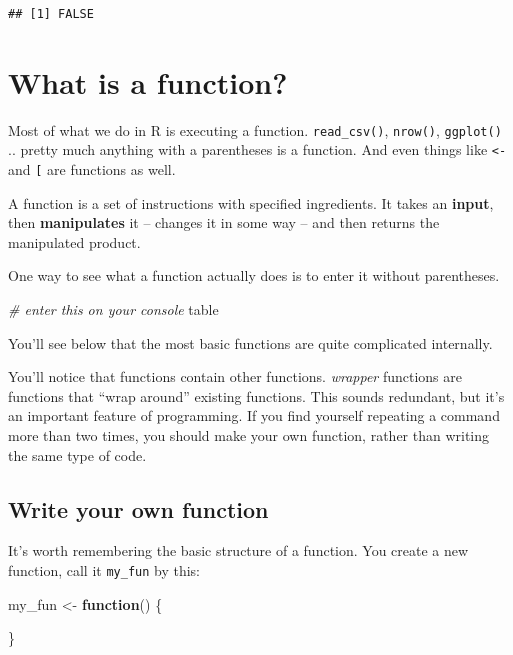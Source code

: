 \documentclass[]{book}
\newenvironment{Shaded}{\begin{snugshade}}{\end{snugshade}}
\newcommand{\StringTok}[1]{\textcolor[rgb]{0.31,0.60,0.02}{#1}}
\newcommand{\CommentTok}[1]{\textcolor[rgb]{0.56,0.35,0.01}{\textit{#1}}}
\newcommand{\ControlFlowTok}[1]{\textcolor[rgb]{0.13,0.29,0.53}{\textbf{#1}}}
\newcommand{\NormalTok}[1]{#1}
\theoremstyle{definition}
\theoremstyle{definition}
\theoremstyle{definition}
\theoremstyle{remark}
\begin{document}
\begin{verbatim}
## [1] FALSE
\end{verbatim}

\section{What is a function?}\label{what-is-a-function}

Most of what we do in R is executing a function. \texttt{read\_csv()},
\texttt{nrow()}, \texttt{ggplot()} .. pretty much anything with a
parentheses is a function. And even things like \texttt{\textless{}-}
and \texttt{{[}} are functions as well.

A function is a set of instructions with specified ingredients. It takes
an \textbf{input}, then \textbf{manipulates} it -- changes it in some
way -- and then returns the manipulated product.

One way to see what a function actually does is to enter it without
parentheses.

\begin{Shaded}
\begin{Highlighting}[]
\CommentTok{# enter this on your console}
\NormalTok{table}
\end{Highlighting}
\end{Shaded}

You'll see below that the most basic functions are quite complicated
internally.

You'll notice that functions contain other functions. \emph{wrapper}
functions are functions that ``wrap around'' existing functions. This
sounds redundant, but it's an important feature of programming. If you
find yourself repeating a command more than two times, you should make
your own function, rather than writing the same type of code.

\subsection{Write your own function}\label{write-your-own-function}

It's worth remembering the basic structure of a function. You create a
new function, call it \texttt{my\_fun} by this:

\begin{Shaded}
\begin{Highlighting}[]
\NormalTok{my_fun <-}\StringTok{ }\ControlFlowTok{function}\NormalTok{() \{}
  
\NormalTok{\}}
\end{Highlighting}
\end{Shaded}
\end{document}
